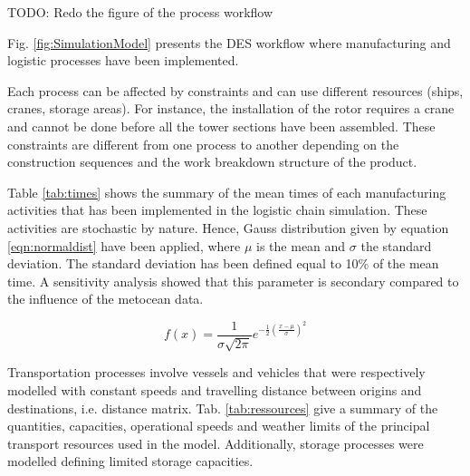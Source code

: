 TODO: Redo the figure of the process workflow

Fig. \ref{fig:SimulationModel} presents the DES workflow where manufacturing and logistic processes have been implemented.

Each process can be affected by constraints and can use different resources (ships, cranes, storage areas). For instance, the installation of the rotor requires a crane and cannot be done before all the tower sections have been assembled. These constraints are different from one process to another depending on the construction sequences and the work breakdown structure of the product.

Table \ref{tab:times} shows the summary of the mean times of each manufacturing activities that has been implemented in the logistic chain simulation. These activities are stochastic by nature. Hence, Gauss distribution given by equation \ref{eqn:normaldist} have been applied, where $\mu$ is the mean and $\sigma$ the standard deviation. The standard deviation has been defined equal to 10\% of the mean time. A sensitivity analysis showed that this parameter is secondary compared to the influence of the metocean data. 

\begin{equation}
\label{eqn:normaldist}
f\left( x \right) = \frac{1}{\sigma \sqrt{2 \pi} } e^{- \frac{1}{2} \left( \frac{x - \mu}{\sigma} \right)^{2}}
\end{equation}

Transportation processes involve vessels and vehicles that were respectively modelled with constant speeds and travelling distance between origins and destinations, i.e. distance matrix. Tab. \ref{tab:ressources} give a summary of the quantities, capacities, operational speeds and weather limits of the principal transport resources used in the model. Additionally, storage processes were modelled defining limited storage capacities.